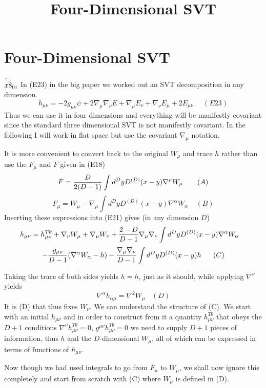\documentclass[10pt,letterpaper]{article}
\title{Four-Dimensional SVT}
\date{}
\numberwithin{equation}{section}
\begin{document}
 
	\maketitle
	\noindent 

\section{Four-Dimensional SVT}
$\overset{"."}{x8}_{0}{}_{i}$
In (E23) in the big paper we worked out an SVT decomposition in any dimension. 
%
$$
h_{\mu\nu}=-2g_{\mu\nu}\psi+2\nabla_{\mu}\nabla_{\nu}E
+ \nabla_{\mu}E_{\nu}+\nabla_{\nu}E_{\mu}+2E_{\mu\nu}~~~~~~(E23)$$
%
Thus we can use it in four dimensions and everything will be manifestly covariant since the standard three dimensional SVT is not manifestly covariant. In the following I will work in flat space but use the covariant $\nabla_{\mu}$ notation.

It is more convenient to convert back to the original $W_{\mu}$ and trace $h$ rather than use the $F_{\mu}$ and $F$ given in (E18)
%
$$F={D \over 2(D-1)}\int d^DyD^{(D)}(x-y)\nabla^{\mu}W_{\mu}~~~~~~(A)$$
%
$$F_{\mu}=W_{\mu}-\nabla_{\mu}\int d^DyD^{(D)}(x-y)\nabla^{\alpha}W_{\alpha}~~~~~(B)$$
%
Inserting these expressions into (E21) gives (in any dimension $D$)
%
$$h_{\mu\nu}=h_{\mu\nu}^{T\theta}+\nabla_{\nu}W_{\mu}+\nabla_{\mu}W_{\nu}+{2-D \over D-1}\nabla_{\mu}\nabla_{\nu}\int d^DyD^{(D)}(x-y)\nabla^{\alpha}W_{\alpha}~~~$$
%
$$-{g_{\mu\nu}\over D-1}(\nabla^{\alpha}W_{\alpha}-h)-{\nabla_{\mu}\nabla_{\nu} \over D-1}\int d^DyD^{(D)}(x-y)h~~~~~(C)$$
%


Taking the trace of both sides yields $h=h$, just as it should, while applying $\nabla^{\nu}$ yields
%
$$\nabla^{\alpha}h_{\alpha\mu}=\nabla^2W_{\mu}~~~~(D)$$
%
It is (D) that thus fixes $W_{\nu}$. We can understand the structure of (C). We start with an initial $h_{\mu\nu}$ and in order to construct from it a quantity $h_{\mu\nu}^{T\theta}$ that obeys the $D+1$ conditions $\nabla^{\nu}h_{\mu\nu}^{T\theta}=0$, $g^{\mu\nu}h_{\mu\nu}^{T\theta}=0$ we need to supply $D+1$ pieces of information, thus $h$ and the $D$-dimensional $W_{\mu}$, all of which can be expressed in terms of functions of $h_{\mu\nu}$.

Now though we had used integrals to go from $F_{\mu}$ to $W_{\mu}$, we shall now ignore this completely and start from scratch with (C) where $W_{\mu}$ is defined in (D).
\end{document}
